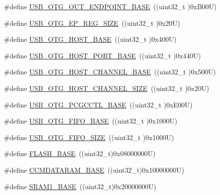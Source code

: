\begin{DoxyCompactItemize}
\item 
\#define \hyperlink{group___peripheral__memory__map_gaf0e972b8f028ecf44a652029efbd4642}{U\+S\+B\+\_\+\+O\+T\+G\+\_\+\+O\+U\+T\+\_\+\+E\+N\+D\+P\+O\+I\+N\+T\+\_\+\+B\+A\+SE}~((uint32\+\_\+t )0x\+B00\+U)
\item 
\#define \hyperlink{group___peripheral__memory__map_ga6fdb7429ad88e2d69440d6ecc4f4199e}{U\+S\+B\+\_\+\+O\+T\+G\+\_\+\+E\+P\+\_\+\+R\+E\+G\+\_\+\+S\+I\+ZE}~((uint32\+\_\+t )0x20\+U)
\item 
\#define \hyperlink{group___peripheral__memory__map_ga3bb2dd6c82eefd8587b6146ba36ae071}{U\+S\+B\+\_\+\+O\+T\+G\+\_\+\+H\+O\+S\+T\+\_\+\+B\+A\+SE}~((uint32\+\_\+t )0x400\+U)
\item 
\#define \hyperlink{group___peripheral__memory__map_ga42f433cb79ca69f09972e690fda6737a}{U\+S\+B\+\_\+\+O\+T\+G\+\_\+\+H\+O\+S\+T\+\_\+\+P\+O\+R\+T\+\_\+\+B\+A\+SE}~((uint32\+\_\+t )0x440\+U)
\item 
\#define \hyperlink{group___peripheral__memory__map_ga942c8c5241b80fbcf638fea0fa18bebd}{U\+S\+B\+\_\+\+O\+T\+G\+\_\+\+H\+O\+S\+T\+\_\+\+C\+H\+A\+N\+N\+E\+L\+\_\+\+B\+A\+SE}~((uint32\+\_\+t )0x500\+U)
\item 
\#define \hyperlink{group___peripheral__memory__map_ga266cb1dbb50faf447f9c15d2ee93a522}{U\+S\+B\+\_\+\+O\+T\+G\+\_\+\+H\+O\+S\+T\+\_\+\+C\+H\+A\+N\+N\+E\+L\+\_\+\+S\+I\+ZE}~((uint32\+\_\+t )0x20\+U)
\item 
\#define \hyperlink{group___peripheral__memory__map_gaa9766975aca084c257730879568bc7cf}{U\+S\+B\+\_\+\+O\+T\+G\+\_\+\+P\+C\+G\+C\+C\+T\+L\+\_\+\+B\+A\+SE}~((uint32\+\_\+t )0x\+E00\+U)
\item 
\#define \hyperlink{group___peripheral__memory__map_gace340350802904868673f0e839c4fa04}{U\+S\+B\+\_\+\+O\+T\+G\+\_\+\+F\+I\+F\+O\+\_\+\+B\+A\+SE}~((uint32\+\_\+t )0x1000\+U)
\item 
\#define \hyperlink{group___peripheral__memory__map_ga8781c4b2406c740d9fe540737a6a0188}{U\+S\+B\+\_\+\+O\+T\+G\+\_\+\+F\+I\+F\+O\+\_\+\+S\+I\+ZE}~((uint32\+\_\+t )0x1000\+U)
\item 
\#define \hyperlink{group___peripheral__memory__map_ga23a9099a5f8fc9c6e253c0eecb2be8db}{F\+L\+A\+S\+H\+\_\+\+B\+A\+SE}~((uint32\+\_\+t)0x08000000\+U)
\item 
\#define \hyperlink{group___peripheral__memory__map_gabea1f1810ebeac402164b42ab54bcdf9}{C\+C\+M\+D\+A\+T\+A\+R\+A\+M\+\_\+\+B\+A\+SE}~((uint32\+\_\+t)0x10000000\+U)
\item 
\#define \hyperlink{group___peripheral__memory__map_ga7d0fbfb8894012dbbb96754b95e562cd}{S\+R\+A\+M1\+\_\+\+B\+A\+SE}~((uint32\+\_\+t)0x20000000\+U)

\end{DoxyCompactItemize}
